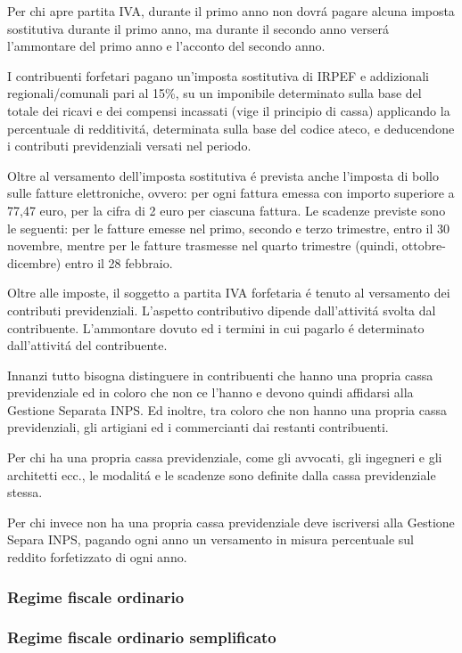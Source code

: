\documentclass{article}
\begin{document}
Per chi apre partita IVA, durante il primo anno non dovr\'a pagare alcuna imposta sostitutiva durante il primo anno, 
ma durante il secondo anno verser\'a l'ammontare del primo anno e l'acconto del secondo anno.

I contribuenti forfetari pagano un'imposta sostitutiva di IRPEF e addizionali regionali/comunali pari al 15\%, su un imponibile determinato sulla base del totale dei ricavi e dei compensi incassati (vige il principio di cassa) applicando la percentuale di redditivit\'a,
determinata sulla base del codice ateco, e deducendone i contributi previdenziali versati nel periodo.

Oltre al versamento dell'imposta sostitutiva \'e prevista anche l'imposta di bollo sulle fatture elettroniche, ovvero:
per ogni fattura emessa con importo superiore a 77,47 euro, per la cifra di 2 euro per ciascuna fattura. Le scadenze previste sono le seguenti:
per le fatture emesse nel primo, secondo e terzo trimestre, entro il 30 novembre, mentre per le fatture trasmesse nel quarto trimestre (quindi, ottobre-dicembre) entro il 28 febbraio. 

Oltre alle imposte, il soggetto a partita IVA forfetaria \'e tenuto al versamento dei contributi previdenziali.
L'aspetto contributivo dipende dall'attivit\'a svolta dal contribuente.
L'ammontare dovuto ed i termini in cui pagarlo \'e determinato dall'attivit\'a del contribuente.

Innanzi tutto bisogna distinguere in contribuenti che hanno una propria cassa previdenziale ed in coloro che non ce l'hanno e devono quindi affidarsi alla Gestione Separata INPS.
Ed inoltre, tra coloro che non hanno una propria cassa previdenziali, gli artigiani ed i commercianti dai restanti contribuenti. 

Per chi ha una propria cassa previdenziale, come gli avvocati, gli ingegneri e gli architetti ecc., le modalit\'a e le scadenze sono definite dalla cassa previdenziale stessa. 

Per chi invece non ha una propria cassa previdenziale deve iscriversi alla Gestione Separa INPS, pagando ogni anno un versamento in misura percentuale sul reddito forfetizzato di ogni anno.


\subsubsection{Regime fiscale ordinario}
\subsubsection{Regime fiscale ordinario semplificato}
\end{document}
